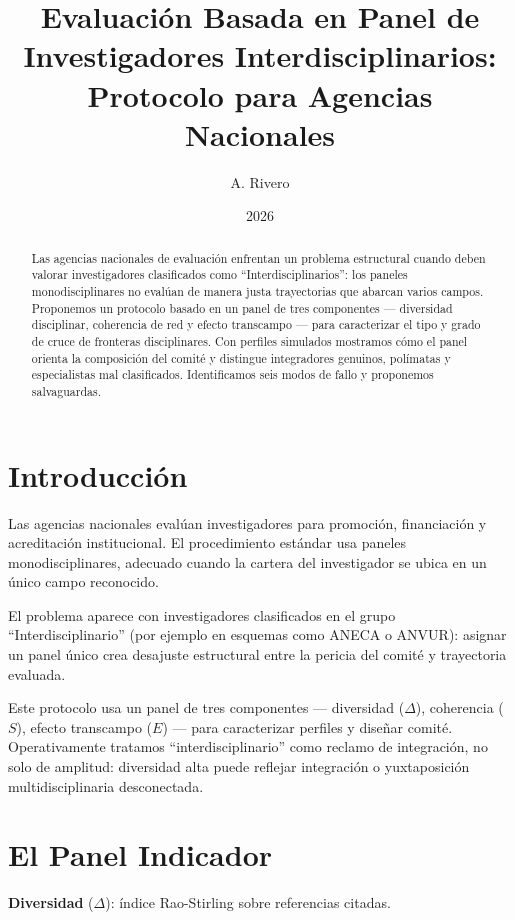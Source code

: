 \documentclass[
]{article}
\title{Evaluación Basada en Panel de Investigadores Interdisciplinarios:
Protocolo para Agencias Nacionales}
\author{A. Rivero}
\date{2026}
\begin{document}
\maketitle
\begin{abstract}
Las agencias nacionales de evaluación enfrentan un problema estructural
cuando deben valorar investigadores clasificados como
``Interdisciplinarios'': los paneles monodisciplinares no evalúan de
manera justa trayectorias que abarcan varios campos. Proponemos un
protocolo basado en un panel de tres componentes --- diversidad
disciplinar, coherencia de red y efecto transcampo --- para caracterizar
el tipo y grado de cruce de fronteras disciplinares. Con perfiles
simulados mostramos cómo el panel orienta la composición del comité y
distingue integradores genuinos, polímatas y especialistas mal
clasificados. Identificamos seis modos de fallo y proponemos
salvaguardas.
\end{abstract}

\hypertarget{introducciuxf3n}{%
\section{Introducción}\label{introducciuxf3n}}

Las agencias nacionales evalúan investigadores para promoción,
financiación y acreditación institucional. El procedimiento estándar usa
paneles monodisciplinares, adecuado cuando la cartera del investigador
se ubica en un único campo reconocido.

El problema aparece con investigadores clasificados en el grupo
``Interdisciplinario'' (por ejemplo en esquemas como ANECA o ANVUR):
asignar un panel único crea desajuste estructural entre la pericia del
comité y trayectoria evaluada.

Este protocolo usa un panel de tres componentes --- diversidad
(\(\Delta\)), coherencia (\(S\)), efecto transcampo (\(E\)) --- para
caracterizar perfiles y diseñar comité. Operativamente tratamos
``interdisciplinario'' como reclamo de integración, no solo de amplitud:
diversidad alta puede reflejar integración o yuxtaposición
multidisciplinaria desconectada.

\hypertarget{el-panel-indicador}{%
\section{El Panel Indicador}\label{el-panel-indicador}}

\textbf{Diversidad} (\(\Delta\)): índice Rao-Stirling sobre referencias
citadas.
\end{document}
